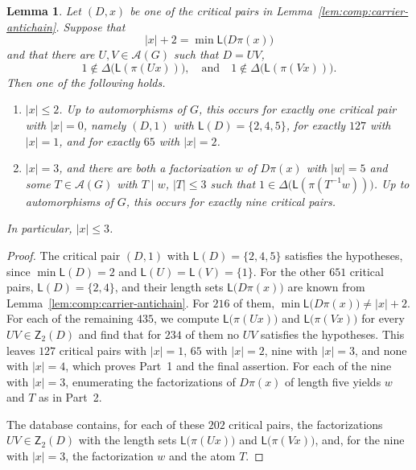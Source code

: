 \documentclass[a4paper, 10pt]{amsart}
\theoremstyle{plain}
\newtheorem{lemma}[theorem]{\bf Lemma}
\theoremstyle{definition}
\theoremstyle{definition}
\newcommand{\code}[1]{\texttt{\detokenize{#1}}}
\numberwithin{equation}{section}
\begin{document}
\begin{lemma} \label{lem:comp:carrier-minimum-side}
Let $(D,x)$ be one of the critical pairs in Lemma~\ref{lem:comp:carrier-antichain}.
Suppose that
\[
 |x|+2 = \min \mathsf L \big( D \pi (x) \big)
\]
and that there are $U,V \in \mathcal A (G)$ such that $D=UV$, 
\[
 1 \notin \Delta \big( \mathsf L (\pi (Ux)) \big),
 \quad \text{and} \quad
 1 \notin \Delta \big(\mathsf L (\pi (Vx)) \big) .
\]
Then one of the following holds.
\begin{enumerate}
\item $|x| \le 2$.  Up to automorphisms of $G$, this occurs for exactly
      one critical pair with $|x|=0$, namely $(D,1)$ with
      $\mathsf L (D) = \{2,4,5\}$, for exactly $127$ with $|x|=1$,
      and for exactly $65$ with $|x|=2$.
\item $|x|=3$, and there are both a factorization $w$ of $D\pi(x)$ with $|w|=5$
      and some $T \in \mathcal A (G)$ with  $T \mid w$,  $|T| \le 3$ such that
      $1 \in \Delta \big( \mathsf L (\pi (T^{-1}w)) \big)$.  Up to automorphisms of
      $G$, this occurs for exactly nine critical pairs.
\end{enumerate}
In particular, $|x| \le 3$.
\end{lemma}

\begin{proof}
The critical pair $(D,1)$ with $\mathsf L (D) = \{2,4,5\}$ satisfies the
hypotheses, since $\min \mathsf L (D) = 2$ and
$\mathsf L (U) = \mathsf L (V) = \{1\}$.  For the other $651$ critical pairs,
$\mathsf L (D) = \{2,4\}$, and their length sets $\mathsf L \big( D\pi(x) \big)$ are
known from Lemma~\ref{lem:comp:carrier-antichain}.  For $216$ of them,
$\min \mathsf L \big( D\pi(x) \big) \ne |x|+2$.  For each of the remaining $435$, we
compute $\mathsf L \big( \pi(Ux) \big)$ and $\mathsf L \big( \pi(Vx) \big)$ for every
$UV \in \mathsf Z_2 (D)$ and find that for $234$ of them no $UV$ satisfies the
hypotheses. This leaves $127$ critical pairs with $|x| = 1$, $65$ with
$|x| = 2$, nine with $|x| = 3$, and none with $|x| = 4$, which proves Part~1
and the final assertion.  For each of the nine with $|x| = 3$, enumerating the
factorizations of $D\pi(x)$ of length five yields $w$ and $T$ as in Part~2.

The database \code{bounded-endpoint.jsonl} contains, for each of these $202$
critical pairs, the factorizations $UV \in \mathsf Z_2 (D)$ with the length
sets $\mathsf L \big( \pi(Ux) \big)$ and $\mathsf L \big( \pi(Vx) \big)$, and, for the nine with
$|x| = 3$, the factorization $w$ and the atom $T$.
\end{proof}
\end{document}
